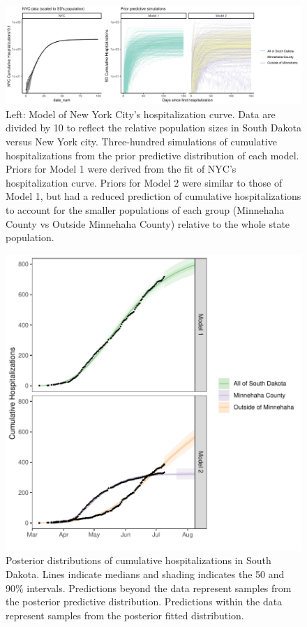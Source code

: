 \documentclass[
]{article}
\begin{document}
\begin{figure}
\centering
\includegraphics{manuscript_files/figure-latex/plot-nyc-1.pdf}
\caption{\label{fig:plot-nyc}Left: Model of New York City's hospitalization curve. Data are divided by 10 to reflect the relative population sizes in South Dakota versus New York city. Three-hundred simulations of cumulative hospitalizations from the prior predictive distribution of each model. Priors for Model 1 were derived from the fit of NYC's hospitalization curve. Priors for Model 2 were similar to those of Model 1, but had a reduced prediction of cumulative hospitalizations to account for the smaller populations of each group (Minnehaha County vs Outside Minnehaha County) relative to the whole state population.\label{prior:plot}}
\end{figure}

\begin{figure}
\centering
\includegraphics{manuscript_files/figure-latex/unnamed-chunk-3-1.pdf}
\caption{\label{fig:unnamed-chunk-3}Posterior distributions of cumulative hospitalizations in South Dakota. Lines indicate medians and shading indicates the 50 and 90\% intervals. Predictions beyond the data represent samples from the posterior predictive distribution. Predictions within the data represent samples from the posterior fitted distribution.\label{post_all:plot}}
\end{figure}
\end{document}
